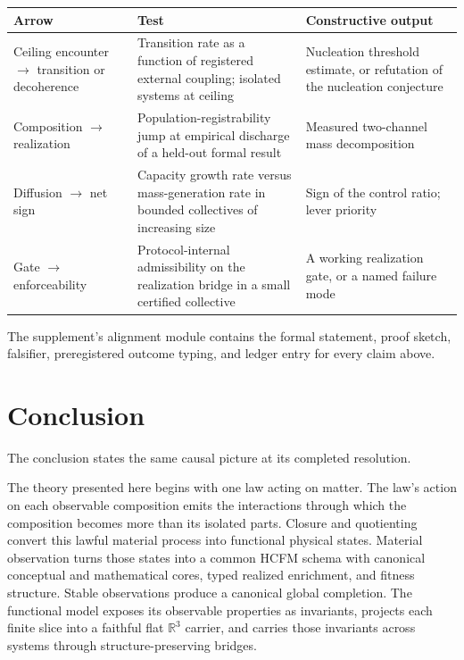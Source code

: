 \documentclass[11pt]{article}
\theoremstyle{definition}
\begin{document}
\begin{center}
\begin{tabular}{@{}p{}p{}p{}@{}}
\toprule
Arrow & Test & Constructive output\\
\midrule
Ceiling encounter $\to$ transition or decoherence & Transition rate as a function of registered external coupling; isolated systems at ceiling & Nucleation threshold estimate, or refutation of the nucleation conjecture\\
Composition $\to$ realization & Population-registrability jump at empirical discharge of a held-out formal result & Measured two-channel mass decomposition\\
Diffusion $\to$ net sign & Capacity growth rate versus mass-generation rate in bounded collectives of increasing size & Sign of the control ratio; lever priority\\
Gate $\to$ enforceability & Protocol-internal admissibility on the realization bridge in a small certified collective & A working realization gate, or a named failure mode\\
\bottomrule
\end{tabular}
\end{center}

The supplement's alignment module contains the formal statement, proof sketch, falsifier, preregistered outcome typing, and ledger entry for every claim above.

\section{Conclusion}

The conclusion states the same causal picture at its completed resolution.

The theory presented here begins with one law acting on matter. The law's action on each observable composition emits the interactions through which the composition becomes more than its isolated parts. Closure and quotienting convert this lawful material process into functional physical states. Material observation turns those states into a common HCFM schema with canonical conceptual and mathematical cores, typed realized enrichment, and fitness structure. Stable observations produce a canonical global completion. The functional model exposes its observable properties as invariants, projects each finite slice into a faithful flat $\mathbb{R}^3$ carrier, and carries those invariants across systems through structure-preserving bridges.
\end{document}
